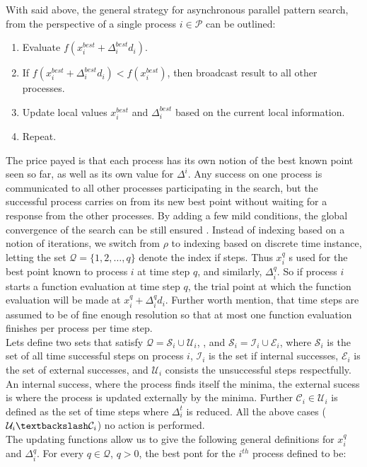  With said above, the general strategy for asynchronous parallel pattern search, from the perspective of a single process $i\in\mathcal{P}$ can be outlined:
		\begin{enumerate}
		\item Evaluate $f(x^{best}_i+\Delta^{best}_id_i)$.
		\item If $f(x^{best}_i+\Delta^{best}_id_i) <f(x^{best}_i)$, then broadcast result to all other processes.
		\item Update local values $x^{best}_i$ and $\Delta^{best}_i$ based on the current local information.
		\item Repeat.
		\end{enumerate}
	The price payed is that each process has its own notion of the best known point seen so far, as well as its own value for	$\Delta^i$. Any success on one process is communicated to all other processes participating in the search, but the successful process carries on from its new best point without waiting for a response from the other processes. By adding a few mild conditions, the global convergence of the search can be still ensured \cite{kolda2003understanding}.  Instead of indexing based on a notion of iterations, we switch from $\rho$ to indexing based on discrete time instance, letting the set $\mathcal{Q}=\{1,2,\dots,q\}$ denote the index if steps. Thus $x_i^q$ s used for the best point known to process $i$ at time step $q$, and similarly, $\Delta_i^q$.  So if process $i$ starts a function evaluation at time step $q$, the trial point at which the function evaluation will be made at $x^{q}_i+\Delta^{q}_id_i$. Further worth mention, that time steps are assumed to be of fine enough resolution so that at most one function evaluation finishes per process per time step.\\
	Lets define two sets that satisfy $\mathcal{Q}=\mathcal{S}_i\cup\mathcal{U}_i$, , and $\mathcal{S}_i=\mathcal{I}_i\cup\mathcal{E}_i$, where $\mathcal{S}_i$ is the set of all time successful steps on process $i$, $\mathcal{I}_i$ is the set if internal successes, $\mathcal{E}_i$ is the set of external successes,   and $\mathcal{U}_i$ consists the unsuccessful steps respectfully. An internal success, where the process finds itself the minima, the external sucess is where the process is updated externally by the minima. Further  $\mathcal{C}_i\in\mathcal{U}_i$ is defined as the set of time steps where $\Delta^t_i$ is reduced. All the above cases ($\mathcal{U}_i\textbackslash\mathcal{C}_i$) no action is performed.\\
	The updating functions allow us to give the following general definitions for $x_i^q$ and $\Delta^q_i$. For every $q\in\mathcal{Q}$, $q>0$, the best pont for the $i^{th}$ process defined to be:
	
